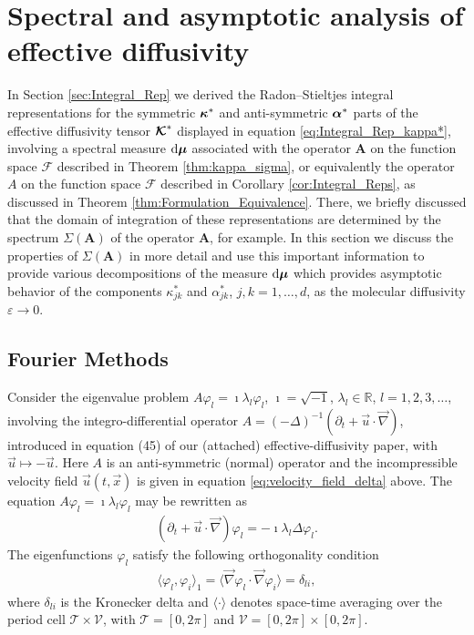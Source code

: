 \documentclass[11pt]{amsart}
\renewcommand{\d}{\mathrm{d}}
\newcommand{\Ab}{\mathbf{A}}
\newcommand\Kbc{\mbox{\boldmath${\mathcal{K}}$}}
\newcommand{\Tc}{\mathcal{T}}
\newcommand{\Vc}{\mathcal{V}}
\newcommand{\Fc}{\mathcal{F}}
\newcommand{\Fs}{\mathscr{F}}
\newcommand\bmu{\mbox{\boldmath${\mu}$}}
\newcommand\balpha{\mbox{\boldmath${\alpha}$}}
\newcommand\bkappa{\mbox{\boldmath${\kappa}$}}
\begin{document}
\section{Spectral and asymptotic analysis of effective
  diffusivity} \label{sec:Assymptotics}
%
In Section \ref{sec:Integral_Rep} we derived the Radon--Stieltjes
integral representations for the symmetric $\bkappa^*$ and
anti-symmetric $\balpha^*$ parts of the effective diffusivity tensor
$\Kbc^*$ displayed in equation \eqref{eq:Integral_Rep_kappa*},
involving a spectral measure $\d\bmu$ associated with the operator
$\Ab$ on the function space $\Fs$ described in Theorem
\ref{thm:kappa_sigma}, or equivalently the operator $A$ on the
function space $\Fc$ described in Corollary
\ref{cor:Integral_Reps}, as discussed in Theorem
\ref{thm:Formulation_Equivalence}. There, we briefly discussed that
the domain of integration of these representations are determined by
the spectrum $\Sigma(\Ab)$ of the operator $\Ab$, for example. In this
section we discuss the properties of $\Sigma(\Ab)$ in more detail and use
this important information to provide various decompositions of the
measure $\d\bmu$ which provides asymptotic behavior of the components 
$\kappa^*_{jk}$ and $\alpha^*_{jk}$, $j,k=1,\ldots,d$, as the molecular diffusivity
$\varepsilon\to0$. 







\subsection{Fourier Methods}\label{sec:Fourier_Methods}
%
Consider the eigenvalue problem $A\varphi_l=\imath\lambda_l\varphi_l$, $\imath=\sqrt{-1}$,
$\lambda_l\in\mathbb{R}$, $l=1,2,3,\ldots$, involving the integro-differential operator
$A=(-\Delta)^{-1}(\partial_t+\vec{u}\cdot\vec{\nabla})$,  
introduced in equation (45) of our (attached) effective-diffusivity
paper, with $\vec{u}\mapsto-\vec{u}$. Here $A$ is an anti-symmetric (normal)
operator and the incompressible velocity field
$\vec{u}(t,\vec{x})$
is given in equation \eqref{eq:velocity_field_delta} above. The equation $A\varphi_l=\imath\lambda_l\varphi_l$ may be
rewritten as     
%
\begin{align}\label{eq:Eig_prob}
  (\partial_t+\vec{u}\cdot\vec{\nabla})\varphi_l=-\imath\lambda_l\Delta\varphi_l.
\end{align}
%
The eigenfunctions $\varphi_l$ satisfy the following orthogonality condition
%
\begin{align}\label{eq:Orthogonal}
  \langle\varphi_l,\varphi_i\rangle_1=\langle\vec{\nabla}\varphi_l\cdot\vec{\nabla}\varphi_i\rangle=\delta_{li},
\end{align}
%
where $\delta_{li}$ is the Kronecker delta and $\langle\cdot\rangle$ denotes space-time
averaging over the period cell $\Tc\times\Vc$, with $\Tc=[0,2\pi]$ and
$\Vc=[0,2\pi]\times[0,2\pi]$.
\end{document}

